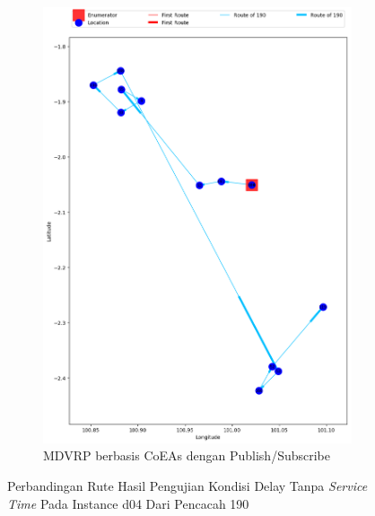 \begin{figure}[H]\ContinuedFloat
	\centering
	\begin{subfigure}[t]{\textwidth}
		\centering
		\includegraphics[width=\textwidth]{Resources/Images/delayed_5/real_m15_n100_delayed_5_190_pubsub_coes}
		\caption{MDVRP berbasis CoEAs dengan Publish/Subscribe}
		\label{fig:real_m15_n100_delayed_5_190_pubsub_coes}
	\end{subfigure}
	\caption{Perbandingan Rute Hasil Pengujian Kondisi Delay Tanpa \textit{Service Time} Pada Instance d04 Dari Pencacah 190}
	\label{fig:real_m15_n100_delayed_5_190_contd}
\end{figure}


